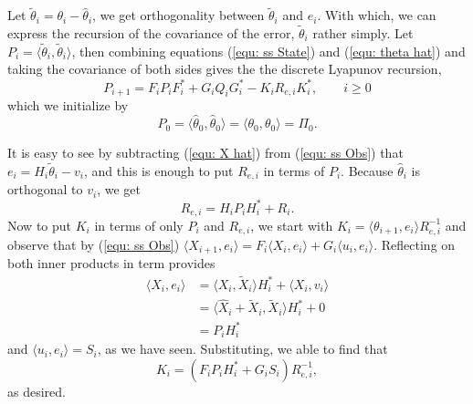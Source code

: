 \documentclass[12pt]{amsart}
\begin{document}
Let $\tilde{\theta}_i = \theta_i - \hat{\theta}_{i}$, we get orthogonality between $\tilde{\theta}_{i}$ and $e_i$. With which, we can express the recursion of the covariance of the error, $\tilde{\theta}_{i}$ rather simply. Let $P_{i} = \langle \tilde{\theta}_{i},\tilde{\theta}_{i} \rangle$, then combining equations (\ref{equ: ss State}) and (\ref{equ: theta hat}) and taking the covariance of both sides gives the the discrete Lyapunov recursion,
\begin{equation}
P_{i+1} = F_iP_{i}F_i^* + G_iQ_iG_i^* - K_iR_{e,i}K^*_i,\qquad i\ge 0
\label{equ: DL}
\end{equation}
which we initialize by $$P_{0} = \langle \hat{\theta}_{0}, \hat{\theta}_{0} \rangle = \langle \theta_0, \theta_0 \rangle = \Pi_0.$$ 

It is easy to see by subtracting (\ref{equ: X hat}) from (\ref{equ: ss Obs}) that $e_i = H_i\tilde{\theta}_{i} - v_i$, and this is enough to put $R_{e,i}$ in terms of $P_i$.
Because $\hat{\theta}_{i}$ is orthogonal to $v_i$, we get
$$R_{e,i} = H_iP_iH^*_i + R_i.$$
Now to put $K_i$ in terms of only $P_i$ and $R_{e,i}$, we start with $K_i = \langle \theta_{i+1}, e_i \rangle R_{e,i}^{-1}$ and observe that by (\ref{equ: ss Obs}) $\langle X_{i+1}, e_i \rangle = F_i\langle X_{i}, e_i \rangle  + G_i\langle u_i, e_i \rangle$. Reflecting on both inner products in term provides
\begin{align*}
\langle X_{i}, e_i \rangle &= \langle X_{i}, \tilde{X}_i \rangle H^*_i + \langle X_{i}, v_i \rangle \\
&= \langle \hat{X}_{i} + \tilde{X}_i, \tilde{X}_i \rangle H^*_i + 0 \\
&= P_i H^*_i
\end{align*}
and $\langle u_{i}, e_i \rangle = S_i$, as we have seen. Substituting, we able to find that
$$K_i = (F_iP_iH_i^* + G_iS_i) R_{e,i}^{-1},$$
as desired. 
\end{document}
